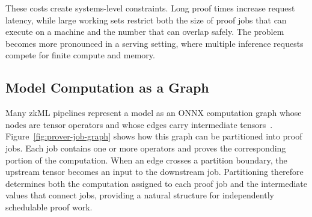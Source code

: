 These costs create systems-level constraints. Long proof times increase request latency, while large working sets restrict both the size of proof jobs that can execute on a machine and the number that can overlap safely. The problem becomes more pronounced in a serving setting, where multiple inference requests compete for finite compute and memory.



\subsection{Model Computation as a Graph}
\label{sec:model-graph}

Many zkML pipelines represent a model as an ONNX computation graph whose nodes are tensor operators and whose edges carry intermediate tensors~\cite{onnx-paper}. Figure~\ref{fig:prover-job-graph} shows how this graph can be partitioned into proof jobs. Each job contains one or more operators and proves the corresponding portion of the computation. When an edge crosses a partition boundary, the upstream tensor becomes an input to the downstream job. Partitioning therefore determines both the computation assigned to each proof job and the intermediate values that connect jobs, providing a natural structure for independently schedulable proof work.
